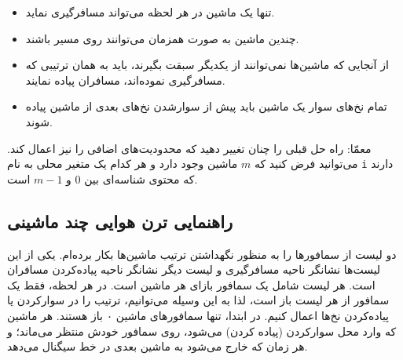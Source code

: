 \documentclass{book}
\newcommand{\clearemptydoublepage}{\newpage\cleardoublepage}
\begin{document}
\begin{itemize}

\item %
    تنها یک ماشین در هر لحظه می‌تواند مسافرگیری نماید.

\item %
    چندین ماشین به صورت همزمان می‌توانند روی مسیر باشند. 

\item %
    از آنجایی که ماشین‌ها نمی‌توانند از یکدیگر سبقت بگیرند، باید به همان ترتیبی که مسافرگیری نموده‌اند، مسافران پیاده نمایند. 

\item %
    تمام نخ‌های سوار یک ماشین باید پیش از سوارشدن نخ‌های بعدی از ماشین پیاده شوند.
\end{itemize}

    معمّا: راه حل قبلی را چنان تغییر دهید که محدودیت‌های اضافی را نیز اعمال کند. 
    می‌توانید فرض کنید که  $m$ ماشین وجود دارد و هر کدام یک متغیر محلی به نام {\tt i} دارند که محتوی شناسه‌‌ای بین 0 و  $m-1$ است. 


\clearemptydoublepage
\subsection{راهنمایی ترن هوایی چند ماشینی}

    دو لیست از سمافورها را به منظور نگهداشتن ترتیب ماشین‌ها بکار برده‌ام. یکی از این لیست‌ها نشانگر ناحیه مسافرگیری و لیست دیگر 
    نشانگر ناحیه پیاده‌کردن مسافران است. هر لیست شامل یک سمافور بازای هر ماشین است. در هر لحظه، فقط یک سمافور از هر لیست باز است، 
    لذا به این وسیله می‌توانیم، ترتیب را در سوارکردن یا پیاده‌کردن نخ‌ها اعمال کنیم. در ابتدا، تنها سمافورهای ماشین ۰ باز هستند. 
    هر ماشین که وارد محل سوارکردن (پیاده کردن) می‌شود،‌ روی سمافور خودش منتظر می‌ماند؛ و هر زمان که خارج می‌شود به ماشین 
    بعدی در خط سیگنال می‌دهد. 
\end{document}

